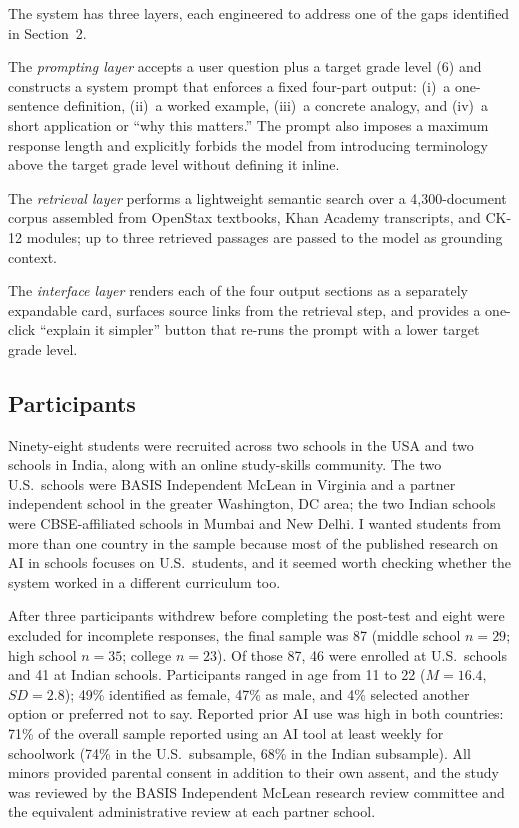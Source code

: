 \documentclass[11pt,letterpaper]{article}
\begin{document}
The system has three layers, each engineered to address one of the gaps
identified in Section~2.

The \emph{prompting layer} accepts a user question plus a target grade level
(6) and constructs a system prompt that enforces a fixed four-part
output: (i)~a one-sentence definition, (ii)~a worked example, (iii)~a concrete
analogy, and (iv)~a short application or ``why this matters.'' The prompt also
imposes a maximum response length and explicitly forbids the model from
introducing terminology above the target grade level without defining it inline.

The \emph{retrieval layer} performs a lightweight semantic search over a
4{,}300-document corpus assembled from OpenStax textbooks, Khan Academy
transcripts, and CK-12 modules; up to three retrieved passages are passed to
the model as grounding context.

The \emph{interface layer} renders each of the four output sections as a
separately expandable card, surfaces source links from the retrieval step, and
provides a one-click ``explain it simpler'' button that re-runs the prompt with
a lower target grade level.

\subsection{Participants}

Ninety-eight students were recruited across two schools in the USA and two
schools in India, along with an online study-skills community. The two U.S.\
schools were BASIS Independent McLean in Virginia and a partner independent
school in the greater Washington, DC area; the two Indian schools were
CBSE-affiliated schools in Mumbai and New Delhi. I wanted students from more
than one country in the sample because most of the published research on AI
in schools focuses on U.S.\ students, and it seemed worth checking whether the
system worked in a different curriculum too.

After three participants withdrew before completing the post-test and eight
were excluded for incomplete responses, the final sample was 87 (middle school
$n = 29$; high school $n = 35$; college $n = 23$). Of those 87, 46 were enrolled
at U.S.\ schools and 41 at Indian schools. Participants ranged in age from
11 to 22 ($M = 16.4$, $SD = 2.8$); 49\% identified as female, 47\% as male,
and 4\% selected another option or preferred not to say. Reported prior AI use
was high in both countries: 71\% of the overall sample reported using an AI
tool at least weekly for schoolwork (74\% in the U.S.\ subsample, 68\% in the
Indian subsample). All minors provided parental consent in addition to their
own assent, and the study was reviewed by the BASIS Independent McLean research
review committee and the equivalent administrative review at each partner
school.
\end{document}
